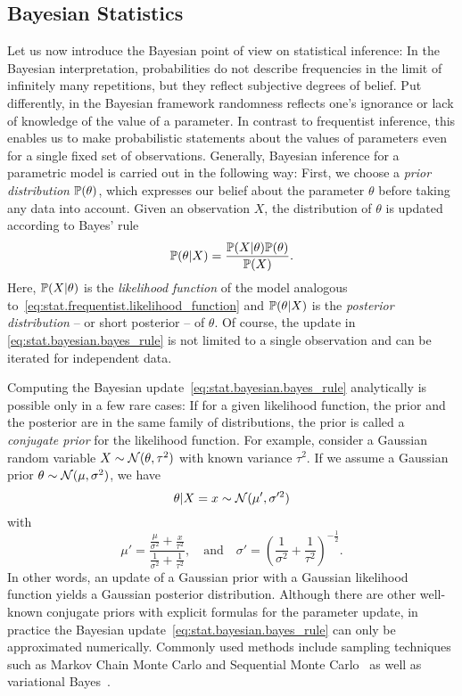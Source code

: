 \subsection{Bayesian Statistics}%
\label{sub:stat.bayesian}


Let us now introduce the Bayesian point of view on statistical inference:
In the Bayesian interpretation, probabilities do not describe frequencies in the limit of infinitely many repetitions, but they reflect subjective degrees of belief.
Put differently, in the Bayesian framework randomness reflects one's ignorance or lack of knowledge of the value of a parameter.
In contrast to frequentist inference, this enables us to make probabilistic statements about the values of parameters even for a single fixed set of observations.
Generally, Bayesian inference for a parametric model is carried out in the following way:
First, we choose a \emph{prior distribution} $\mathbb{P}(\theta)$, which expresses our belief about the parameter $\theta$ before taking any data into account.
Given an observation $X$, the distribution of $\theta$ is updated according to Bayes' rule~\cite{Bolstad_2007_Introduction,Gelman_2014_Bayesian}
\[
  \label{eq:stat.bayesian.bayes_rule}
  \mathbb{P}(\theta | X) = \frac{\mathbb{P}(X | \theta) \mathbb{P}(\theta)}{\mathbb{P}(X)}.
\]
Here, $\mathbb{P}(X|\theta)$ is the \emph{likelihood function} of the model analogous to~\eqref{eq:stat.frequentist.likelihood_function} and $\mathbb{P}(\theta | X)$ is the \emph{posterior distribution} -- or short posterior -- of $\theta$.
Of course, the update in \cref{eq:stat.bayesian.bayes_rule} is not limited to a single observation and can be iterated for independent data.

Computing the Bayesian update~\eqref{eq:stat.bayesian.bayes_rule} analytically is possible only in a few rare cases:
If for a given likelihood function, the prior and the posterior are in the same family of distributions, the prior is called a \emph{conjugate prior} for the likelihood function.
For example, consider a Gaussian random variable $X \sim \mathcal{N}(\theta, \tau^2)$ with known variance $\tau^2$.
If we assume a Gaussian prior $\theta \sim \mathcal{N}(\mu, \sigma^2)$, we have~\cite[Eq.\ (2.10)]{Gelman_2014_Bayesian}
\[
  \theta \vert X=x \sim \mathcal{N} (\mu', \sigma'^2)
\]
with
\[
  \label{eq:stat.bayesian.kalman}
  \mu' = \frac{ \frac{\mu}{\sigma^2} + \frac{x}{\tau^2} }{ \frac{1}{\sigma^2} + \frac{1}{\tau^2} },
  \quad\mbox{and}\quad
  \sigma' = \left( \frac{1}{\sigma^2} + \frac{1}{\tau^2} \right)^{- \tfrac{1}{2}}.
\]
In other words, an update of a Gaussian prior with a Gaussian likelihood function yields a Gaussian posterior distribution.
Although there are other well-known conjugate priors with explicit formulas for the parameter update, in practice the Bayesian update~\eqref{eq:stat.bayesian.bayes_rule} can only be approximated numerically.
Commonly used methods include sampling techniques such as Markov Chain Monte Carlo and Sequential Monte Carlo~\cite{Gelman_2014_Bayesian} as well as variational Bayes~\cite{Fox_2012_Tutorial}.\\


